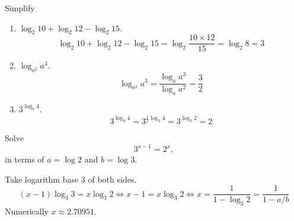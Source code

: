 \documentclass[../main.tex]{subfiles}
\begin{document}
  \begin{example}
    Simplify
    \begin{enumerate}
      \item $\log_2 10 + \log_2 12 - \log_2 15$.
      \[
        \log_2 10 + \log_2 12 - \log_2 15
        = \log_2 \frac{10 \times 12}{15} = \log_2 8 = 3
      \]
      \item $\log_{a^2} a^3$.
      \[
       \log_{a^2} a^3
       = \frac{\log_a a^3}{\log_a a^2} = \frac{3}{2}
     \]
     \item $3^{\log_9 4}$.
     \[
      3^{\log_9 4}
      = 3^{\frac{1}{2} \log_3 4} = 3^{\log_3 2} = 2
    \]
  \end{enumerate}
\end{example}

\begin{example}
  Solve
  \[
    3^{x-1} = 2^x,
  \]
  in terms of $a=\log 2$ and $b=\log 3$.
\end{example}
\begin{solution}
  Take logarithm base 3 of both sides.
  \[
    (x-1) \log_{3} 3 = x \log_{3} 2 \iff
    x-1 = x \log_3 2 \iff
    x = \frac{1}{1- \log_3 2} = \frac{1}{1-a/b}
  \]
  Numerically $x \approx 2.70951$.
\end{solution}
\end{document}
